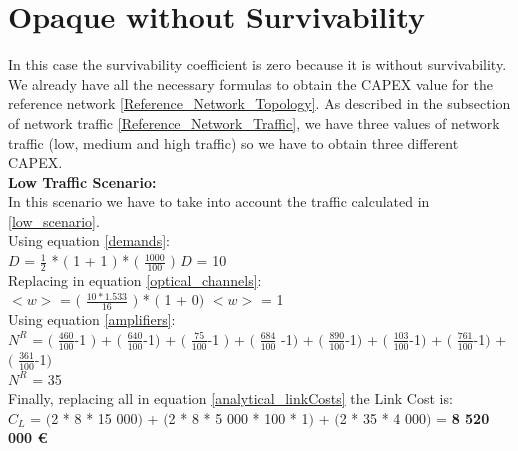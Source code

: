\clearpage

\section{Opaque without Survivability}\label{analytical_Opaque_Survivability}

In this case the survivability coefficient is zero because it is without survivability.\\
We already have all the necessary formulas to obtain the CAPEX value for the reference network \ref{Reference_Network_Topology}. As described in the subsection of network traffic \ref{Reference_Network_Traffic}, we have three values of network traffic (low, medium and high traffic) so we have to obtain three different CAPEX.\\

\textbf{Low Traffic Scenario:}\\

In this scenario we have to take into account the traffic calculated in \ref{low_scenario}.\\

Using equation \ref{demands}:\\

$D$ = $\frac{1}{2}$ * $($ 1 + 1 $)$ * $($ $\frac{1000}{100}$ $)$ \qquad \qquad $D$ = 10\\

Replacing in equation \ref{optical_channels}:\\

$<w>$ = $($ $\frac{10 * 1.533}{16}$ $)$ * $($ 1 + 0$)$ \qquad \qquad $<w>$ = 1\\

Using equation \ref{amplifiers}:\\

$N^R$ = $($ $\frac{460}{100}$-1 $)$ + $($ $\frac{640}{100}$-1$)$ + $($ $\frac{75}{100}$-1 $)$ + $($ $\frac{684}{100}$ -1$)$ + $($ $\frac{890}{100}$-1$)$ + $($ $\frac{103}{100}$-1$)$ + $($ $\frac{761}{100}$-1$)$ + $($ $\frac{361}{100}$-1$)$\\

$N^R$ = 35\\

Finally, replacing all in equation \ref{analytical_linkCosts} the Link Cost is:\\

$C_L$ = $($2 * 8 * 15 000$)$ + $($2 * 8 * 5 000 * 100 * 1$)$ + $($2 * 35 * 4 000$)$ = \textbf{8 520 000 \euro}\\

